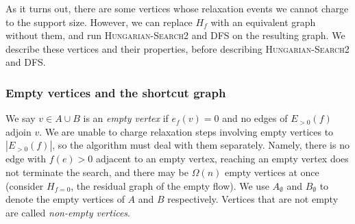 \documentclass[11pt]{article}
\def\eps{\varepsilon}
\DeclareMathOperator*{\argmin}{arg\,min}
\theoremstyle{plain}
\numberwithin{figure}{section}
\begin{document}
%

As it turns out, there are some vertices whose relaxation events we cannot
charge to the support size.
However, we can replace $H_f$ with an equivalent graph without them,
and run \textsc{Hungarian-Search2} and \textsc{DFS} on the resulting graph.
We describe these vertices and their properties, before describing
\textsc{Hungarian-Search2} and \textsc{DFS}.

\subsubsection{Empty vertices and the shortcut graph}

We say $v \in A \cup B$ is an \emph{empty vertex} if $e_f(v) = 0$ and no edges
of $E_{>0}(f)$ adjoin $v$.
We are unable to charge relaxation steps involving empty vertices to
$|E_{>0}(f)|$, so the algorithm must deal with them separately.
Namely, there is no edge with $f(e) > 0$ adjacent to an empty vertex,
reaching an empty vertex does not terminate the search, and there may be
$\Omega(n)$ empty vertices at once (consider $H_{f = 0}$, the residual graph
of the empty flow).
We use $A_\emptyset$ and $B_\emptyset$ to denote the empty vertices of $A$ and
$B$ respectively.
Vertices that are not empty are called \emph{non-empty vertices}.
\end{document}
